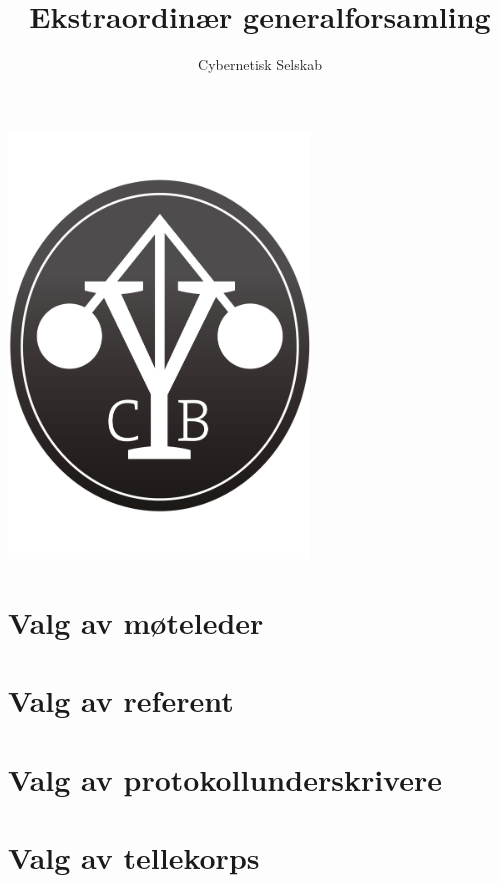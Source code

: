 \documentclass[10pt,norsk,a4paper,usenames,dvipsnames]{article}
\title{\huge Ekstraordinær generalforsamling}
\author{\LARGE Cybernetisk Selskab}
\begin{document}
\maketitle



\begin{center}


\includegraphics[width=0.6\textwidth,height=0.6\textheight,keepaspectratio=true]{cyblogoa3.pdf}

\end{center}


\newpage


\tableofcontents

\section{Valg av møteleder}

\section{Valg av referent}

\section{Valg av protokollunderskrivere}

\section{Valg av tellekorps}
\end{document}
